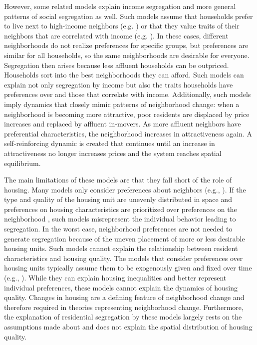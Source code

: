 \documentclass[a4paper,12pt]{article}
\begin{document}
However, some related models explain income segregation and more general patterns of social segregation as well. Such models assume that households prefer to live next to high-income neighbors (e.g. \cite{tieboutPureTheoryLocal1956, guerrieriEndogenousGentrificationHousing2013}) or that they value traits of their neighbors that are correlated with income (e.g. \cite{bayerEquilibriumModelSorting2004, fossettEthnicPreferencesSocial2006, benardWealthStatusBasedModel2007, yavasDissectingIncomeSegregation2019}). In these cases, different neighborhoods do not realize preferences for specific groups, but preferences are similar for all households, so the same neighborhoods are desirable for everyone. Segregation then arises because less affluent households can be outpriced. Households sort into the best neighborhoods they can afford. Such models can explain not only segregation by income but also the traits households have preferences over and those that correlate with income. Additionally, such models imply dynamics that closely mimic patterns of neighborhood change: when a neighborhood is becoming more attractive, poor residents are displaced by price increases and replaced by affluent in-movers. As more affluent neighbors have preferential characteristics, the neighborhood increases in attractiveness again. A self-reinforcing dynamic is created that continues until an increase in attractiveness no longer increases prices and the system reaches spatial equilibrium.

The main limitations of these models are that they fall short of the role of housing. Many models only consider preferences about neighbors (e.g., \cite{guerrieriEndogenousGentrificationHousing2013, yavasDissectingIncomeSegregation2019}). If the type and quality of the housing unit are unevenly distributed in space \citep{loufPatternsResidentialSegregation2016, oecdDividedCitiesUnderstanding2018, owensBuildingInequalityHousing2019} and preferences on housing characteristics are prioritized over preferences on the neighborhood \citep{chauCriticalReviewLiterature2003, bayerEquilibriumModelSorting2004, mummoloWhyPartisansNot2017, delucaNotJustLateral2020}, such models misrepresent the individual behavior leading to segregation. In the worst case, neighborhood preferences are not needed to generate segregation because of the uneven placement of more or less desirable housing units. Such models cannot explain the relationship between resident characteristics and housing quality. The models that consider preferences over housing units typically assume them to be exogenously given and fixed over time (e.g., \cite{bayerEquilibriumModelSorting2004, fossettEthnicPreferencesSocial2006, benardWealthStatusBasedModel2007}). While they can explain housing inequalities and better represent individual preferences, these models cannot explain the dynamics of housing quality. Changes in housing are a defining feature of neighborhood change \citep{zukinGentrificationCultureCapital1987, redfernWhatMakesGentrification2003} and therefore required in theories representing neighborhood change. Furthermore, the explanation of residential segregation by these models largely rests on the assumptions made about and does not explain the spatial distribution of housing quality.
\end{document}
